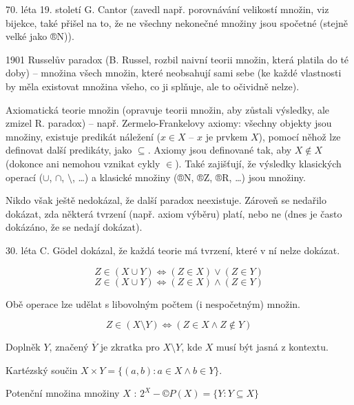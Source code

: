 \documentclass[12pt]{article}					%
\begin{document}
        \begin{poznamka}
            70. léta 19. století G. Cantor (zavedl např. porovnávání velikostí množin, viz bijekce, také přišel na to, že ne všechny nekonečné množiny jsou spočetné (stejně velké jako ®N)).

            1901 Russelův paradox (B. Russel, rozbil naivní teorii množin, která platila do té doby) -- množina všech množin, které neobsahují sami sebe (ke každé vlastnosti by měla existovat množina všeho, co ji splňuje, ale to očividně nelze).

            Axiomatická teorie množin (opravuje teorii množin, aby zůstali výsledky, ale zmizel R. paradox) -- např. Zermelo-Frankelovy axiomy: všechny objekty jsou množiny, existuje predikát náležení ($x \in X$ -- $x$ je prvkem $X$), pomocí něhož lze definovat další predikáty, jako $\subseteq$. Axiomy jsou definované tak, aby $X \notin X$ (dokonce ani nemohou vznikat cykly $\in$). Také zajišťují, že výsledky klasických operací ($\cup$, $\cap$, $\setminus$, …) a klasické množiny (®N, ®Z, ®R, …) jsou množiny.

            Nikdo však ještě nedokázal, že další paradox neexistuje. Zároveň se nedařilo dokázat, zda některá tvrzení (např. axiom výběru) platí, nebo ne (dnes je často dokázáno, že se nedají dokázat).

            30. léta C. Gödel dokázal, že každá teorie má tvrzení, které v ní nelze dokázat.
        \end{poznamka}

        \begin{definice}
            $$ Z \in (X \cup Y) \Leftrightarrow (Z \in X) \lor (Z \in Y) $$
            $$ Z \in (X \cup Y) \Leftrightarrow (Z \in X) \land (Z \in Y) $$

            Obě operace lze udělat s libovolným počtem (i nespočetným) množin.

            $$ Z \in (X \setminus Y) \Leftrightarrow (Z \in X \land Z \notin Y) $$

            Doplněk $Y$, značený $\overline{Y}$ je zkratka pro $X \setminus Y$, kde $X$ musí být jasná z kontextu.

            Kartézský součin $X\times Y = \{(a,b): a\in X \land b\in Y\}$.

            Potenční množina množiny $X$ : $2^X - ©P(X) = \{Y : Y \subseteq X\}$
        \end{definice}

\end{document}
